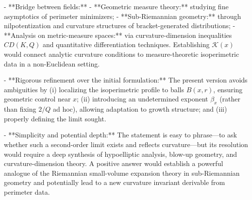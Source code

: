 - **Bridge between fields:**  
  - **Geometric measure theory:** studying fine asymptotics of perimeter minimizers;  
  - **Sub-Riemannian geometry:** through nilpotentization and curvature structures of bracket-generated distributions;  
  - **Analysis on metric-measure spaces:** via curvature-dimension inequalities \(CD(K,Q)\) and quantitative differentiation techniques.  
  Establishing \(\mathcal{K}(x)\) would connect analytic curvature conditions to measure-theoretic isoperimetric data in a non-Euclidean setting.

- **Rigorous refinement over the initial formulation:**  
  The present version avoids ambiguities by (i) localizing the isoperimetric profile to balls \(B(x,r)\), ensuring geometric control near \(x\); (ii) introducing an undetermined exponent \(\beta_x\) (rather than fixing \(2/Q\) ad hoc), allowing adaptation to growth structure; and (iii) properly defining the limit sought.

- **Simplicity and potential depth:**  
  The statement is easy to phrase—to ask whether such a second-order limit exists and reflects curvature—but its resolution would require a deep synthesis of hypoelliptic analysis, blow-up geometry, and curvature-dimension theory. A positive answer would establish a powerful analogue of the Riemannian small-volume expansion theory in sub-Riemannian geometry and potentially lead to a new curvature invariant derivable from perimeter data.